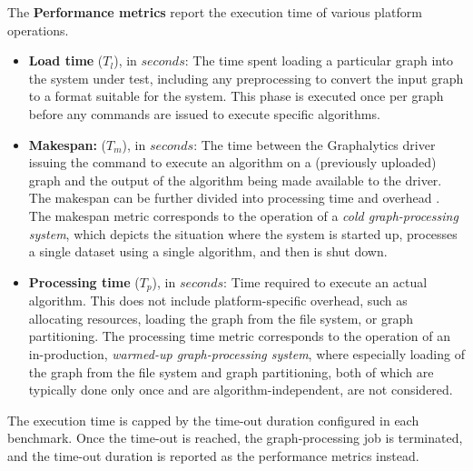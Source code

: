 The {\bf Performance metrics} report the execution time of various platform operations.

\begin{itemize}
	\item {\bf Load time} ($T_l$), in $\textit{seconds}$:  The time spent loading a particular graph into the system under test, including any preprocessing to convert the input graph to a format suitable for the system. This phase is executed once per graph before any commands are issued to execute specific algorithms.
	\item {\bf Makespan:} ($T_m$), in $\textit{seconds}$: The time between the Graphalytics driver issuing the command to execute an algorithm on a (previously uploaded) graph and the output of the algorithm being made available to the driver. The makespan can be further divided into processing time and overhead . The makespan metric corresponds to the operation of a {\it cold graph-processing system}, which depicts the situation where the system is started up, processes a single dataset using a single algorithm, and then is shut down.
	\item {\bf Processing time} ($T_p$), in $\textit{seconds}$: Time required to execute an actual algorithm. This does not include platform-specific overhead, such as allocating resources, loading the graph from the file system, or graph partitioning. The processing time metric corresponds to the operation of an in-production, {\it warmed-up graph-processing system}, where especially loading of the graph from the file system and graph partitioning, both of which are typically done only once and are algorithm-independent, are not considered.
\end{itemize}

The execution time is capped by the time-out duration configured in each benchmark. Once the time-out is reached, the graph-processing job is terminated, and the time-out duration is reported as the performance metrics instead.

